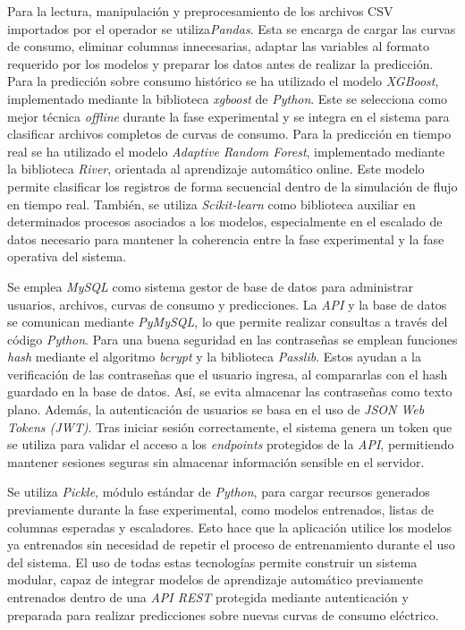 \documentclass[12pt,a4paper]{report}
\begin{document}
Para la lectura, manipulación y preprocesamiento de los archivos CSV importados por el operador se utiliza\emph{Pandas}. Esta se encarga de cargar las curvas de consumo, eliminar columnas innecesarias, adaptar las variables al formato requerido por los modelos y preparar los datos antes de realizar la predicción. Para la predicción sobre consumo histórico se ha utilizado el modelo \emph{XGBoost}, implementado mediante la biblioteca \emph{xgboost} de \emph{Python}. Este se selecciona como mejor técnica \emph{offline} durante la fase experimental y se integra en el sistema para clasificar archivos completos de curvas de consumo. Para la predicción en tiempo real se ha utilizado el modelo \emph{Adaptive Random Forest}, implementado mediante la biblioteca \emph{River}, orientada al aprendizaje automático online. Este modelo permite clasificar los registros de forma secuencial dentro de la simulación de flujo en tiempo real. También, se utiliza \emph{Scikit-learn} como biblioteca auxiliar en determinados procesos asociados a los modelos, especialmente en el escalado de datos necesario para mantener la coherencia entre la fase experimental y la fase operativa del sistema.

Se emplea \emph{MySQL} como sistema gestor de base de datos para administrar usuarios, archivos, curvas de consumo y predicciones. La \emph{API} y la base de datos se comunican mediante \emph{PyMySQL}, lo que permite realizar consultas a través del código \emph{Python}. Para una buena seguridad en las contraseñas se emplean funciones \emph{hash} mediante el algoritmo \emph{bcrypt} y la biblioteca \emph{Passlib}. Estos ayudan a la verificación de las contraseñas que el usuario ingresa, al compararlas con el hash guardado en la base de datos. Así, se evita almacenar las contraseñas como texto plano. Además, la autenticación de usuarios se basa en el uso de \emph{JSON Web Tokens (JWT)}. Tras iniciar sesión correctamente, el sistema genera un token que se utiliza para validar el acceso a los \emph{endpoints} protegidos de la \emph{API}, permitiendo mantener sesiones seguras sin almacenar información sensible en el servidor.

Se utiliza \emph{Pickle}, módulo estándar de \emph{Python}, para cargar recursos generados previamente durante la fase experimental, como modelos entrenados, listas de columnas esperadas y escaladores. Esto hace que la aplicación utilice los modelos ya entrenados sin necesidad de repetir el proceso de entrenamiento durante el uso del sistema. El uso de todas estas tecnologías permite construir un sistema modular, capaz de integrar modelos de aprendizaje automático previamente entrenados dentro de una \emph{API REST} protegida mediante autenticación y preparada para realizar predicciones sobre nuevas curvas de consumo eléctrico.
\end{document}
